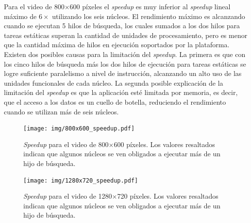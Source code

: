 Para el video de 800$\times$600 píxeles el \emph{speedup} es muy inferior al
\emph{speedup} lineal máximo de $6\times$ utilizando los seis núcleos. El
rendimiento máximo es alcanzando cuando se ejecutan 5 hilos de búsqueda, los
cuales sumados a los dos hilos para tareas estáticas superan la cantidad de
unidades de procesamiento, pero es menor que la cantidad máxima de hilos en
ejecución soportados por la plataforma. Existen dos posibles causas para la
limitación del \emph{speedup}. La primera es que con los cinco hilos de búsqueda
más los dos hilos de ejecución para tareas estáticas se logre suficiente
paralelismo a nivel de instrucción, alcanzando un alto uso de las unidades
funcionales de cada núcleo. La segunda posible explicación de la limitación del
\emph{speedup} es que la aplicación esté limitada por memoria, es decir, que el
acceso a los datos es un cuello de botella, reduciendo el rendimiento cuando se
utilizan más de seis núcleos.

\begin{figure}[!htb]

	\texttt{[image: img/800x600\_speedup.pdf]}
	\caption{\emph{Speedup} para el video de 800$\times$600 píxeles. Los
	valores resaltados indican que algunos núcleos se ven obligados a ejecutar
	más de un hijo de búsqueda.}
	\label{speedUp800}

\end{figure}

\begin{figure}[!htb]

	\texttt{[image: img/1280x720\_speedup.pdf]}
	\caption{\emph{Speedup} para el video de 1280$\times$720 píxeles. Los
	valores resaltados indican que algunos núcleos se ven obligados a ejecutar
	más de un hijo de búsqueda.}

	\label{speedUp1280}

\end{figure}
